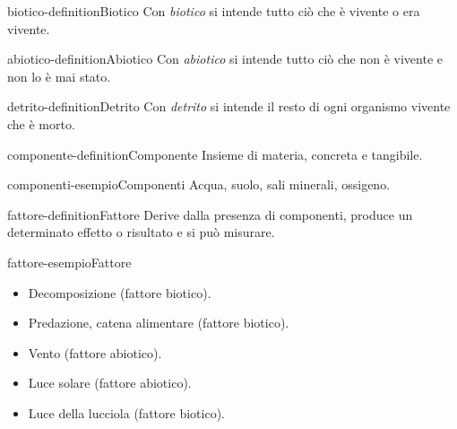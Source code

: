 \documentclass[preview]{standalone}
\begin{document}

\begin{snippetdefinition}{biotico-definition}{Biotico}
    Con \textit{biotico} si intende tutto ciò che è vivente o era vivente.
\end{snippetdefinition}

\begin{snippetdefinition}{abiotico-definition}{Abiotico}
    Con \textit{abiotico} si intende tutto ciò che non è vivente e non lo è mai stato.
\end{snippetdefinition}

\begin{snippetdefinition}{detrito-definition}{Detrito}
    Con \textit{detrito} si intende il resto di ogni organismo vivente che è morto.
\end{snippetdefinition}


\begin{snippetdefinition}{componente-definition}{Componente}
    Insieme di materia, concreta e tangibile.
\end{snippetdefinition}

\begin{snippetexample}{componenti-esempio}{Componenti}
    Acqua, suolo, sali minerali, ossigeno.
\end{snippetexample}

\begin{snippetdefinition}{fattore-definition}{Fattore}
    Derive dalla presenza di componenti, produce un determinato effetto o risultato e si può misurare.
\end{snippetdefinition}

\begin{snippetexample}{fattore-esempio}{Fattore}
    \begin{itemize}
        \item Decomposizione (fattore biotico).
        \item Predazione, catena alimentare (fattore biotico).
        \item Vento (fattore abiotico).
        \item Luce solare (fattore abiotico).
        \item Luce della lucciola (fattore biotico).
    \end{itemize}
\end{snippetexample}
\end{document}
